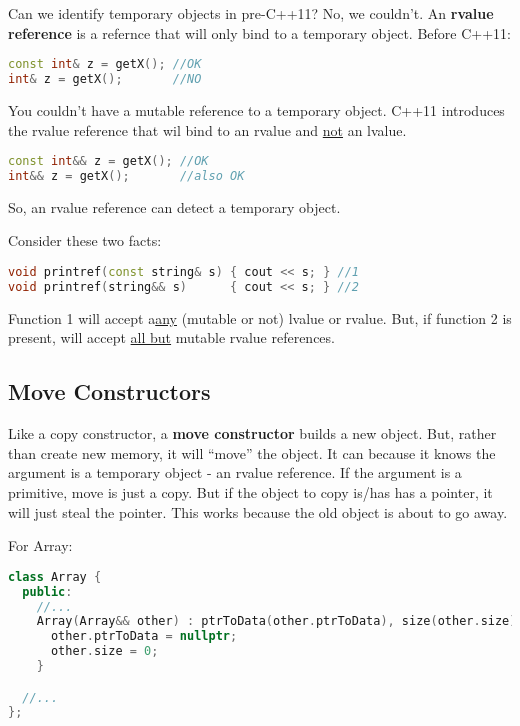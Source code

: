 Can we identify temporary objects in pre-C++11? No, we couldn't. An \textbf{rvalue reference} is a refernce that will only bind to a temporary object. Before C++11:

\begin{lstlisting}[language=C++]
const int& z = getX(); //OK
int& z = getX();       //NO
\end{lstlisting}

You couldn't have a mutable reference to a temporary object. C++11 introduces the rvalue reference that wil bind to an rvalue and \underline{not} an lvalue.

\begin{lstlisting}[language=C++]
const int&& z = getX(); //OK
int&& z = getX();       //also OK
\end{lstlisting}

So, an rvalue reference can detect a temporary object. 

Consider these two facts:

\begin{lstlisting}[language=C++]
void printref(const string& s) { cout << s; } //1
void printref(string&& s)      { cout << s; } //2
\end{lstlisting}

Function 1 will accept a\underline{any} (mutable or not) lvalue or rvalue. But, if function 2 is present, will accept \underline{all but} mutable rvalue references.


\subsection{Move Constructors}

Like a copy constructor, a \textbf{move constructor} builds a new object. But, rather than create new memory, it will ``move'' the object. It can because it knows the argument is a temporary object - an rvalue reference. If the argument is a primitive, move is just a copy. But if the object to copy is/has  has a pointer, it will just steal the pointer. This works because the old object is about to go away.

For Array:

\begin{lstlisting}[language=C++]
class Array {
  public:
    //...
    Array(Array&& other) : ptrToData(other.ptrToData), size(other.size) {
      other.ptrToData = nullptr;
      other.size = 0;
    }

  //...
};
\end{lstlisting}

